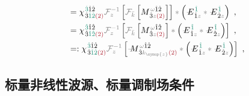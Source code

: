 \begin{subequations}
\begin{align}
	&= {\chi}^{\;\! \textcolor{PineGreen}{\hat{3}} \hat{1} \hat{2} }_{\;\! \hat{3} \textcolor{PineGreen}{\hat{1} \hat{2}} \textcolor{Maroon}{(2)}} \mathcolor{gray}{\mathcal F_{z}^{-1}} \left[ \mathcolor{gray}{\mathcal F_{\bar{k}}} \left[ M^{\;\! \mathcolor{gray}{\omega} \hat{1} \hat{2} }_{\;\! \hat{3} \mathcolor{gray}{z} \textcolor{Maroon}{(2)} } \right] \right] \mathcolor{gray}{*} \left( \Xint{\mathcolor{gray}{-}}{295}{E}^{\;\!\textcolor{PineGreen}{\hat{1}}}_{\;\! \hat{1} \mathcolor{gray}{z}} \mathcolor{gray}{*} \Xint{\mathcolor{gray}{-}}{295}{E}^{\;\!\textcolor{PineGreen}{\hat{1}}}_{\;\! \hat{2} \mathcolor{gray}{z}} \right) ~, \label{eq:DP^(2)-3_12-C4} \\
	&= {\chi}^{\;\! \textcolor{PineGreen}{\hat{3}} \hat{1} \hat{2} }_{\;\! \hat{3} \textcolor{PineGreen}{\hat{1} \hat{2}} \textcolor{Maroon}{(2)}} \mathcolor{gray}{\mathcal F_{z}^{-1}} \left[ \mathcolor{gray}{\mathcal F_{\bar{k}}} \left[ M^{\;\! \mathcolor{gray}{\omega} \hat{1} \hat{2} }_{\;\! \hat{3} \mathcolor{gray}{z} \textcolor{Maroon}{(2)} } \right] \mathcolor{gray}{*} \left( \Xint{\mathcolor{gray}{-}}{295}{E}^{\;\!\textcolor{PineGreen}{\hat{1}}}_{\;\! \hat{1} \mathcolor{gray}{z}} \mathcolor{gray}{*} \Xint{\mathcolor{gray}{-}}{295}{E}^{\;\!\textcolor{PineGreen}{\hat{1}}}_{\;\! \hat{2} \mathcolor{gray}{z}} \right) \right] ~, \label{eq:DP^(2)-3_12-C5} \\
	&=: {\chi}^{\;\! \textcolor{PineGreen}{\hat{3}} \hat{1} \hat{2} }_{\;\! \hat{3} \textcolor{PineGreen}{\hat{1} \hat{2}} \textcolor{Maroon}{(2)}} \mathcolor{gray}{\mathcal F_{z}^{-1}} \left[ \Xint{\mathcolor{gray}{-}}{18}{M}^{\;\! \mathcolor{gray}{\omega} \hat{1} \hat{2} }_{\;\! \hat{3} \mathcolor{gray}{k_{\symup{z}}} \textcolor{Maroon}{(2)} } \mathcolor{gray}{*} \left( \Xint{\mathcolor{gray}{-}}{295}{E}^{\;\!\textcolor{PineGreen}{\hat{1}}}_{\;\! \hat{1} \mathcolor{gray}{z}} \mathcolor{gray}{*} \Xint{\mathcolor{gray}{-}}{295}{E}^{\;\!\textcolor{PineGreen}{\hat{1}}}_{\;\! \hat{2} \mathcolor{gray}{z}} \right) \right] ~, \label{eq:DP^(2)-3_12-C6}
\end{align}
\end{subequations}

\subsection{标量非线性波源、标量调制场条件}\label{ssec:scalar}

